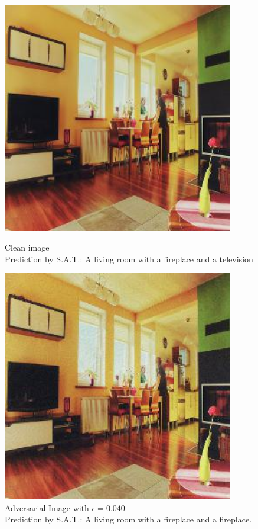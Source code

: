 \begin{figure}[ht]
    \centering
    \begin{minipage}{0.45\textwidth}
        \centering
        \includegraphics[width=0.9\textwidth]{../code/ShowDistractAndDeceive/samples/0.000/img_0.jpg} %
        \caption*{Clean image\\Prediction by S.A.T.: A living room with a fireplace and a television}
    \end{minipage}\hfill
    \begin{minipage}{0.45\textwidth}
        \centering
        \includegraphics[width=0.9\textwidth]{../code/ShowDistractAndDeceive/samples/0.040/img_0.jpg} %
        \caption*{Adversarial Image with $\epsilon=0.040$\\Prediction by S.A.T.: A living room with a fireplace and a fireplace.}
    \end{minipage}
\end{figure}

